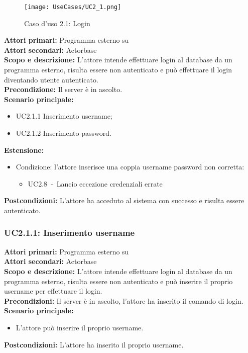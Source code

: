 \documentclass{scalatekids-article}
\begin{document}
\begin{figure}[H]
  \begin{center}
    \texttt{[image: UseCases/UC2\_1.png]}
    \caption*{Caso d'uso 2.1: Login}
  \end{center}
\end{figure}
\textbf{Attori primari:} Programma esterno su \\
\textbf{Attori secondari:} Actorbase\\
\textbf{Scopo e descrizione:}
L'attore intende effettuare login al database da un programma  esterno, risulta essere non autenticato e può effettuare il login diventando utente autenticato.\\
\textbf{Precondizione:} Il server è in ascolto.\\
\textbf{Scenario principale:}
\begin{itemize}
\item UC2.1.1 Inserimento username;
\item UC2.1.2 Inserimento password.
\end{itemize}
\textbf{Estensione:}
\begin{itemize}
\item Condizione: l'attore inserisce una coppia username password non corretta:
  \begin{itemize}
  \item UC2.8\ -\ Lancio eccezione credenziali errate
  \end{itemize}
\end{itemize}
\textbf{Postcondizioni:} L'attore ha acceduto al sistema con successo e risulta essere autenticato.

\subsubsection{UC2.1.1: Inserimento username}

\textbf{Attori primari:} Programma esterno su \\
\textbf{Attori secondari:} Actorbase\\
\textbf{Scopo e descrizione:}
L'attore intende effettuare login al database da un programma  esterno, risulta essere non autenticato e può inserire il proprio username per effettuare il login.\\
\textbf{Precondizioni:} Il server è in ascolto, l'attore ha inserito il comando di login.\\
\textbf{Scenario principale:}
\begin{itemize}
\item L'attore può inserire il proprio username.
\end{itemize}
\textbf{Postcondizioni:} L'attore ha inserito il proprio username.
\end{document}
